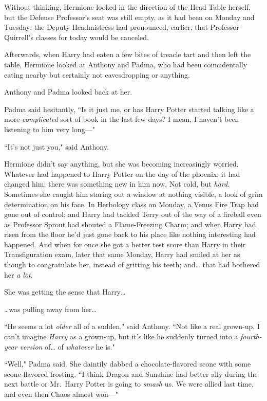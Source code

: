 Without thinking, Hermione looked in the direction of the Head Table herself, but the Defense Professor's seat was still empty, as it had been on Monday and Tuesday; the Deputy Headmistress had pronounced, earlier, that Professor Quirrell's classes for today would be canceled.

Afterwards, when Harry had eaten a few bites of treacle tart and then left the table, Hermione looked at Anthony and Padma, who had been coincidentally eating nearby but certainly not eavesdropping or anything.

Anthony and Padma looked back at her.

Padma said hesitantly, ``Is it just me, or has Harry Potter started talking like a more \emph{complicated} sort of book in the last few days? I mean, I haven't been listening to him very long---"

``It's not just you," said Anthony.

Hermione didn't say anything, but she was becoming increasingly worried. Whatever had happened to Harry Potter on the day of the phoenix, it had changed him; there was something new in him now. Not cold, but \emph{hard}. Sometimes she caught him staring out a window at nothing visible, a look of grim determination on his face. In Herbology class on Monday, a Venus Fire Trap had gone out of control; and Harry had tackled Terry out of the way of a fireball even as Professor Sprout had shouted a Flame-Freezing Charm; and when Harry had risen from the floor he'd just gone back to his place like nothing interesting had happened. And when for once she got a better test score than Harry in their Transfiguration exam, later that same Monday, Harry had smiled at her as though to congratulate her, instead of gritting his teeth; and{\ldots} that had bothered her \emph{a lot}.

She was getting the sense that Harry{\ldots}

{\ldots}was pulling away from her{\ldots}

``He seems a lot \emph{older} all of a sudden," said Anthony. ``Not like a real grown-up, I can't imagine \emph{Harry} as a grown-up, but it's like he suddenly turned into a \emph{fourth-year version} of{\ldots} of \emph{whatever} he is."

``Well," Padma said. She daintily dabbed a chocolate-flavored scone with some scone-flavored frosting. ``I think Dragon and Sunshine had better ally during the next battle or Mr.~Harry Potter is going to \emph{smash} us. We were allied last time, and even then Chaos almost won---"

